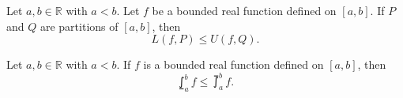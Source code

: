 \begin{lemma}
  Let $a, b \in \mathbb{R}$ with $a < b$.
  Let $f$ be a bounded real function defined on $[a, b]$.
  If $P$ and $Q$ are partitions of $[a, b]$, then
  \begin{equation*}
    L(f, P) \leq U(f, Q).
  \end{equation*}
\end{lemma}

\begin{theorem}
  Let $a, b \in \mathbb{R}$ with $a < b$.
  If $f$ is a bounded real function defined on $[a, b]$, then
  \begin{equation*}
    \lowint_a^b f \leq \upint_a^b f.
  \end{equation*}
\end{theorem}

